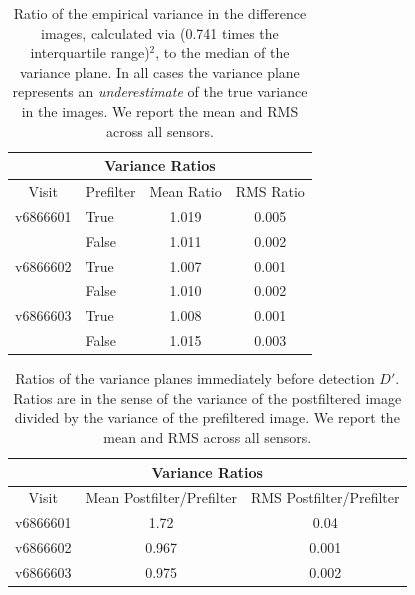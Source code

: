 \documentclass[prd, nofootinbib, floatfix, 11pt,tightenlines,times]{article}
\begin{document}
\begin{table}
\centering
\begin{tabular}{clcc}
\hline
\multicolumn{4}{|c|}{Variance Ratios} \\
\hline
Visit    & Prefilter & Mean Ratio & RMS Ratio \\
\hline
v6866601 & True      & 1.019      & 0.005    \\
         & False     & 1.011      & 0.002    \\
v6866602 & True      & 1.007      & 0.001    \\
         & False     & 1.010      & 0.002    \\
v6866603 & True      & 1.008      & 0.001    \\
         & False     & 1.015      & 0.003    \\
\end{tabular}
\caption{Ratio of the empirical variance in the difference images,
  calculated via (0.741 times the interquartile range)$^2$, to the
  median of the variance plane.  In all cases the variance plane
  represents an {\it underestimate} of the true variance in the
  images.  We report the mean and RMS across all sensors.  }
\label{tab-variance1}
\end{table}

\begin{table}
\centering
\begin{tabular}{ccc}
\hline
\multicolumn{3}{|c|}{Variance Ratios} \\
\hline
Visit    & Mean Postfilter/Prefilter & RMS Postfilter/Prefilter \\
\hline
v6866601 & 1.72      & 0.04     \\
v6866602 & 0.967     & 0.001    \\
v6866603 & 0.975     & 0.002    \\
\end{tabular}
\caption{Ratios of the variance planes immediately before detection
  $D'$.  Ratios are in the sense of the variance of the postfiltered
  image divided by the variance of the prefiltered image.  We report
  the mean and RMS across all sensors.}
\label{tab-variance2}
\end{table}


\clearpage
\end{document}
